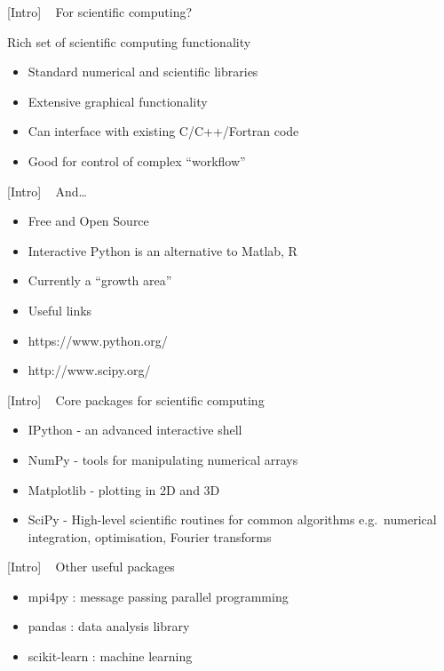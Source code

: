 \documentclass{article}
\begin{document}
    {[}Intro{]} ~ For scientific computing?

Rich set of scientific computing functionality

\begin{itemize}
\itemsep1pt\parskip0pt
\item
  Standard numerical and scientific libraries
\item
  Extensive graphical functionality
\item
  Can interface with existing C/C++/Fortran code
\item
  Good for control of complex ``workflow''
\end{itemize}

 

    {[}Intro{]} ~ And\ldots{}

\begin{itemize}
\item
  Free and Open Source
\item
  Interactive Python is an alternative to Matlab, R
\item
  Currently a ``growth area''
\item
  Useful links
\item
  https://www.python.org/
\item
  http://www.scipy.org/
\end{itemize}

 

    {[}Intro{]} ~ Core packages for scientific computing

\begin{itemize}
\item
  IPython - an advanced interactive shell
\item
  NumPy - tools for manipulating numerical arrays
\item
  Matplotlib - plotting in 2D and 3D
\item
  SciPy - High-level scientific routines for common algorithms
  e.g.~numerical integration, optimisation, Fourier transforms
\end{itemize}

 

    {[}Intro{]} ~ Other useful packages

\begin{itemize}
\item
  mpi4py : message passing parallel programming
\item
  pandas : data analysis library
\item
  scikit-learn : machine learning
\end{itemize}
\end{document}
